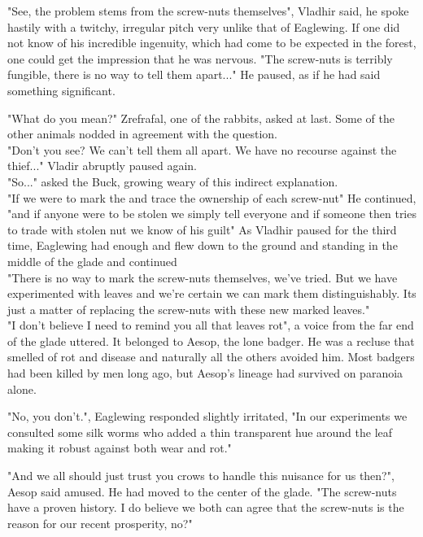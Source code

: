 \documentclass[smalldemyvopaper,11pt,twoside,onecolumn,openright,extrafontsizes]{memoir}
\begin{document}
"See, the problem stems from the screw-nuts themselves", Vladhir said, he spoke hastily with a twitchy, irregular pitch very unlike that of Eaglewing. If one did not know of his incredible ingenuity, which had come to be expected in the forest, one could get the impression that he was nervous. "The screw-nuts is terribly fungible, there is no way to tell them apart..." He paused, as if he had said something significant.  

"What do you mean?" Zrefrafal, one of the rabbits, asked at last. Some of the other animals nodded in agreement with the question.\\

"Don't you see? We can't tell them all apart. We have no recourse against the thief..." Vladir abruptly paused again.\\

"So..." asked the Buck, growing weary of this indirect explanation.\\

"If we were to mark the and trace the ownership of each screw-nut" He continued, "and if anyone were to be stolen we simply tell everyone and if someone then tries to trade with stolen nut we know of his guilt" As Vladhir paused for the third time, Eaglewing had enough and flew down to the ground and standing in the middle of the glade and continued \\

"There is no way to mark the screw-nuts themselves, we've tried. But we have experimented with leaves and we're certain we can mark them distinguishably. Its just a matter of replacing the screw-nuts with these new marked leaves."\\

"I don't believe I need to remind you all that leaves rot", a voice from the far end of the glade uttered. It belonged to Aesop, the lone badger. He was a recluse that smelled of rot and disease and naturally all the others avoided him. Most badgers had been killed by men long ago, but Aesop's lineage had survived on paranoia alone. 

"No, you don't.", Eaglewing responded slightly irritated, "In our experiments we consulted some silk worms who added a thin transparent hue around the leaf making it robust against both wear and rot."

"And we all should just trust you crows to handle this nuisance for us then?", Aesop said amused. He had moved to the center of the glade. "The screw-nuts have a proven history. I do believe we both can agree that the screw-nuts is the reason for our recent prosperity, no?"
\end{document}
